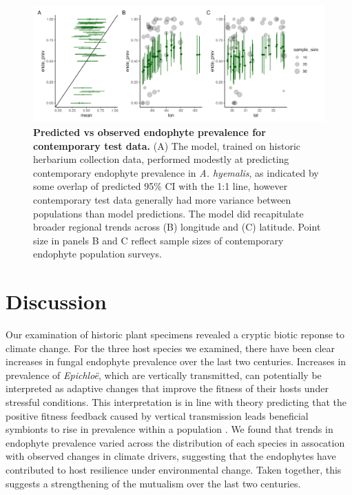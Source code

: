 \documentclass[11pt]{article}
\let\cite\citep
\begin{document}
\begin{figure}[H]
	\centering
	\includegraphics[width = \linewidth]{contemp_test_plot.png}
	\caption{\textbf{Predicted vs observed endophyte prevalence for contemporary test data.} (A) The model, trained on historic herbarium collection data, performed modestly at predicting contemporary endophyte prevalence in \emph{A. hyemalis}, as indicated by some overlap of predicted 95\% CI with the 1:1 line, however contemporary test data generally had more variance between populations than model predictions. The model did recapitulate broader regional trends across (B) longitude and (C) latitude. Point size in panels B and C reflect sample sizes of contemporary endophyte population surveys.}
\end{figure}

\section*{Discussion}
Our examination of historic plant specimens revealed a cryptic biotic reponse to climate change. 
For the three host species we examined, there have been clear increases in fungal endophyte prevalence over the last two centuries.
Increases in prevalence of \emph{Epichloë}, which are vertically transmitted, can potentially be interpreted as adaptive changes that improve the fitness of their hosts under stressful conditions.
This interpretation is in line with theory predicting that the positive fitness feedback caused by vertical transmission leads beneficial symbionts to rise in prevalence within a population \cite{fine1975vectors}.
We found that trends in endophyte prevalence varied across the distribution of each species in assocation with observed changes in climate drivers, suggesting that the endophytes have contributed to host resilience under environmental change.
Taken together, this suggests a strengthening of the mutualism over the last two centuries.
\end{document}
